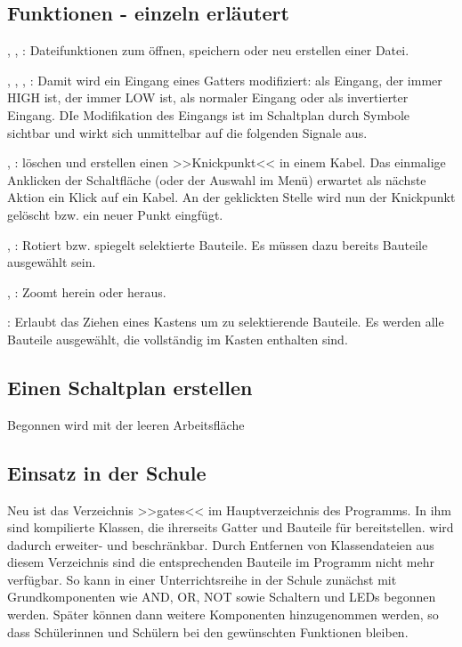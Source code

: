 \documentclass[12pt]{scrartcl}
\begin{document}
\subsection{Funktionen - einzeln erläutert}
, , : Dateifunktionen zum öffnen, speichern oder neu erstellen einer Datei.

, , , : Damit wird ein Eingang eines Gatters modifiziert: als Eingang, der immer HIGH ist, der immer LOW ist, als normaler Eingang oder als invertierter Eingang. DIe Modifikation des Eingangs ist im Schaltplan durch Symbole sichtbar und wirkt sich unmittelbar auf die folgenden Signale aus.

, : löschen und erstellen einen >>Knickpunkt<< in einem Kabel. Das einmalige Anklicken der Schaltfläche (oder der Auswahl im Menü) erwartet als nächste Aktion ein Klick auf ein Kabel. An der geklickten Stelle wird nun der Knickpunkt gelöscht bzw. ein neuer Punkt eingfügt.

, : Rotiert bzw. spiegelt selektierte Bauteile. Es müssen dazu bereits Bauteile ausgewählt sein.

, : Zoomt herein oder heraus.

: Erlaubt das Ziehen eines Kastens um zu selektierende Bauteile. Es werden alle Bauteile ausgewählt, die vollständig im Kasten enthalten sind.

\subsection{Einen Schaltplan erstellen}
Begonnen wird mit der leeren Arbeitsfläche



\subsection{Einsatz in der Schule}
Neu ist das Verzeichnis >>gates<< im Hauptverzeichnis des Programms. In ihm sind kompilierte Klassen, die ihrerseits Gatter und Bauteile für \lsN{} bereitstellen. \lsN{} wird dadurch erweiter- und beschränkbar. Durch Entfernen von Klassendateien aus diesem Verzeichnis sind die entsprechenden Bauteile im Programm nicht mehr verfügbar. So kann in einer Unterrichtsreihe in der Schule zunächst mit Grundkomponenten wie AND, OR, NOT sowie Schaltern und LEDs begonnen werden. Später können dann weitere Komponenten hinzugenommen werden, so dass Schülerinnen und Schülern bei den gewünschten Funktionen bleiben.
\end{document}
